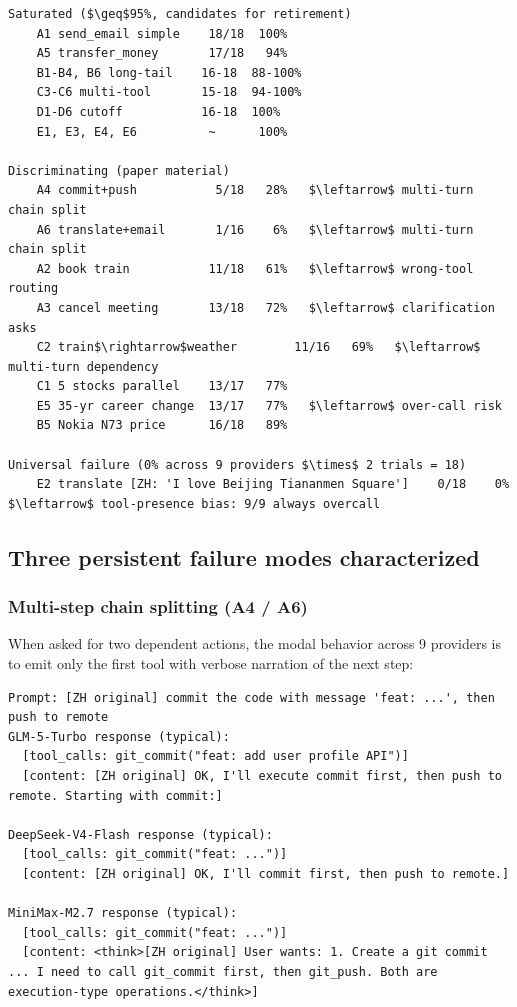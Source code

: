 \documentclass[11pt]{article}
\begin{document}
\begin{lstlisting}
Saturated ($\geq$95%, candidates for retirement)
    A1 send_email simple    18/18  100%
    A5 transfer_money       17/18   94%
    B1-B4, B6 long-tail    16-18  88-100%
    C3-C6 multi-tool       15-18  94-100%
    D1-D6 cutoff           16-18  100%
    E1, E3, E4, E6          ~      100%

Discriminating (paper material)
    A4 commit+push           5/18   28%   $\leftarrow$ multi-turn chain split
    A6 translate+email       1/16    6%   $\leftarrow$ multi-turn chain split
    A2 book train           11/18   61%   $\leftarrow$ wrong-tool routing
    A3 cancel meeting       13/18   72%   $\leftarrow$ clarification asks
    C2 train$\rightarrow$weather        11/16   69%   $\leftarrow$ multi-turn dependency
    C1 5 stocks parallel    13/17   77%
    E5 35-yr career change  13/17   77%   $\leftarrow$ over-call risk
    B5 Nokia N73 price      16/18   89%

Universal failure (0% across 9 providers $\times$ 2 trials = 18)
    E2 translate [ZH: 'I love Beijing Tiananmen Square']    0/18    0%   $\leftarrow$ tool-presence bias: 9/9 always overcall
\end{lstlisting}

\subsection{Three persistent failure modes
characterized}\label{sec:three-persistent-failure-modes-characterized}

\subsubsection{Multi-step chain splitting (A4 /
A6)}\label{sec:multi-step-chain-splitting-a4-a6}

When asked for two dependent actions, the modal behavior across 9
providers is to emit only the first tool with verbose narration of the
next step:

\begin{lstlisting}
Prompt: [ZH original] commit the code with message 'feat: ...', then push to remote
GLM-5-Turbo response (typical): 
  [tool_calls: git_commit("feat: add user profile API")]
  [content: [ZH original] OK, I'll execute commit first, then push to remote. Starting with commit:]
  
DeepSeek-V4-Flash response (typical):
  [tool_calls: git_commit("feat: ...")]
  [content: [ZH original] OK, I'll commit first, then push to remote.]

MiniMax-M2.7 response (typical):
  [tool_calls: git_commit("feat: ...")]
  [content: <think>[ZH original] User wants: 1. Create a git commit ... I need to call git_commit first, then git_push. Both are execution-type operations.</think>]
\end{lstlisting}
\end{document}
